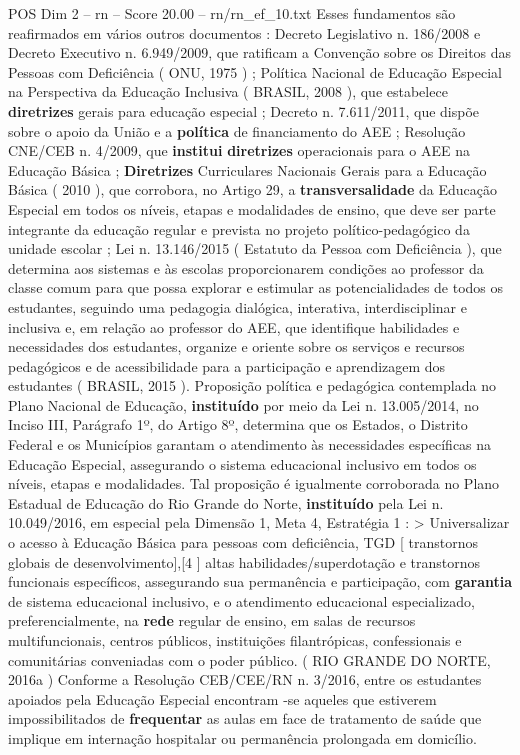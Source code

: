 \begin{textsample}{POS Dim 2 – rn – Score 20.00 – rn/rn\_ef\_10.txt}
Esses fundamentos são reafirmados em vários outros documentos : Decreto Legislativo n. 186/2008 e Decreto Executivo n. 6.949/2009, que ratificam a Convenção sobre os Direitos das Pessoas com Deficiência ( ONU, 1975 ) ; Política Nacional de Educação Especial na Perspectiva da Educação Inclusiva ( BRASIL, 2008 ), que estabelece \textbf{diretrizes} gerais para educação especial ; Decreto n. 7.611/2011, que dispõe sobre o apoio da União e a \textbf{política} de financiamento do AEE ; Resolução CNE/CEB n. 4/2009, que \textbf{institui} \textbf{diretrizes} operacionais para o AEE na Educação Básica ; \textbf{Diretrizes} Curriculares Nacionais Gerais para a Educação Básica ( 2010 ), que corrobora, no Artigo 29, a \textbf{transversalidade} da Educação Especial em todos os níveis, etapas e modalidades de ensino, que deve ser parte integrante da educação regular e prevista no projeto político-pedagógico da unidade escolar ; Lei n. 13.146/2015 ( Estatuto da Pessoa com Deficiência ), que determina aos sistemas e às escolas proporcionarem condições ao professor da classe comum para que possa explorar e estimular as potencialidades de todos os estudantes, seguindo uma pedagogia dialógica, interativa, interdisciplinar e inclusiva e, em relação ao professor do AEE, que identifique habilidades e necessidades dos estudantes, organize e oriente sobre os serviços e recursos pedagógicos e de acessibilidade para a participação e aprendizagem dos estudantes ( BRASIL, 2015 ).
Proposição política e pedagógica contemplada no Plano Nacional de Educação, \textbf{instituído} por meio da Lei n. 13.005/2014, no Inciso III, Parágrafo 1º, do Artigo 8º, determina que os Estados, o Distrito Federal e os Municípios garantam o atendimento às necessidades específicas na Educação Especial, assegurando o sistema educacional inclusivo em todos os níveis, etapas e modalidades.
Tal proposição é igualmente corroborada no Plano Estadual de Educação do Rio Grande do Norte, \textbf{instituído} pela Lei n. 10.049/2016, em especial pela Dimensão 1, Meta 4, Estratégia 1 : > Universalizar o acesso à Educação Básica para pessoas com deficiência, TGD [ transtornos globais de desenvolvimento],[4 ] altas habilidades/superdotação e transtornos funcionais específicos, assegurando sua permanência e participação, com \textbf{garantia} de sistema educacional inclusivo, e o atendimento educacional especializado, preferencialmente, na \textbf{rede} regular de ensino, em salas de recursos multifuncionais, centros públicos, instituições filantrópicas, confessionais e comunitárias conveniadas com o poder público. ( RIO GRANDE DO NORTE, 2016a ) Conforme a Resolução CEB/CEE/RN n. 3/2016, entre os estudantes apoiados pela Educação Especial encontram -se aqueles que estiverem impossibilitados de \textbf{frequentar} as aulas em face de tratamento de saúde que implique em internação hospitalar ou permanência prolongada em domicílio.

\end{textsample}

